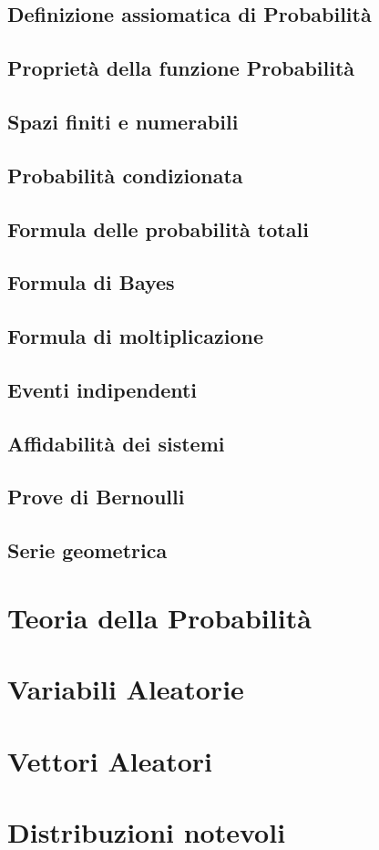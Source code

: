 \documentclass[12pt,openany]{amsbook}
\begin{document}
        \section{Definizione assiomatica di Probabilità}
        \section{Proprietà della funzione Probabilità}
        \section{Spazi finiti e numerabili}
        \section{Probabilità condizionata}
        \section{Formula delle probabilità totali}
        \section{Formula di Bayes}
        \section{Formula di moltiplicazione}
        \section{Eventi indipendenti}
        \section{Affidabilità dei sistemi}
        \section{Prove di Bernoulli}
        \section{Serie geometrica}

    \chapter{Teoria della Probabilità}

    \chapter{Variabili Aleatorie}

    \chapter{Vettori Aleatori}

    \chapter{Distribuzioni notevoli}
\end{document}
